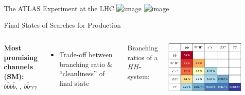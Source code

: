 \documentclass[11pt, xcolor={dvipsnames}, aspectratio=169]{beamer}
\begin{document}

\begin{frame}{The ATLAS Experiment at the LHC}
  \centering
  \includegraphics<1>[scale=0.95]{lhc_atlas/lhc_atlas_1}
  \includegraphics<2>[scale=0.95]{lhc_atlas/lhc_atlas_2}
\end{frame}


\begin{frame}{Final States of Searches for \HH Production}
  \begin{columns}[onlytextwidth]

    \textbf{Most promising
      channels (SM):}\\
    $b\bar{b}b\bar{b}$, \bbtautau, $b\bar{b}\gamma\gamma$
    \begin{itemize}
    \item Trade-off between branching ratio \& ``cleanliness'' of final state
    \end{itemize}

    \centering

    {\small Branching ratios of a $HH$-system:}

    \vspace*{0.5em}

    \includegraphics[width=0.9\textwidth]{theory/di_higgs_branching_ratio}
  \end{columns}
\end{frame}

\end{document}
